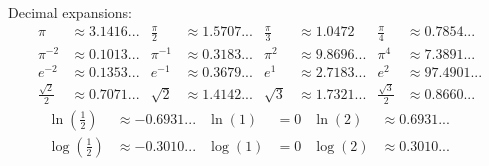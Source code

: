 \documentclass[landscape,paperwidth=1920pt, paperheight = 1080pt,fontscale=0.45,columns=3, margin = 0px]{Poster} %
\begin{document}
\begin{poster}
{Decimal expansions:
\begin{align*}
  \pi &\approx 3.1416... & \frac{\pi}{2} &\approx 1.5707... & \frac{\pi}{3} &\approx 1.0472 & \frac{\pi}{4} &\approx 0.7854...\\[0.5em]
  \pi^{-2}&\approx 0.1013...&\pi^{-1} &\approx 0.3183...&\pi^2 &\approx 9.8696...& \pi^4&\approx 7.3891...\\[0.5em]
  e^{-2}&\approx 0.1353...&e^{-1} &\approx 0.3679...&e^1 &\approx 2.7183...& e^2&\approx 97.4901...\\[0.5em]
  \frac{\sqrt{2}}{2} &\approx 0.7071... & \sqrt{2} &\approx 1.4142... & \sqrt{3}&\approx 1.7321... & \frac{\sqrt{3}}{2} &\approx 0.8660...
\end{align*}\vspace{-1.5em}
\begin{align*}
  \ln\left(\frac{1}{2}\right) &\approx -0.6931... & \ln(1) &= 0 &\ln(2) &\approx 0.6931... && \\[0.5em]
  \log\left(\frac{1}{2}\right) &\approx -0.3010... & \log(1) &= 0 &\log(2) &\approx 0.3010... && \\
\end{align*}

}



\end{poster}
\end{document}
